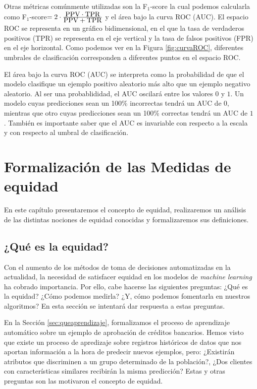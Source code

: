 \documentclass[oneside,openright,titlepage,numbers=noenddot,openany,headinclude,footinclude=true,
cleardoublepage=empty,abstractoff,BCOR=5mm,paper=a4,fontsize=12pt,main=spanish]{scrreprt}
\begin{document}
Otras métricas comúnmente utilizadas son la F$_1$-score la cual podemos calcularla como F$_1$-score$=2 \cdot \frac{\displaystyle \text{PPV}\cdot \text{TPR}}{\displaystyle \text{PPV}+\text{TPR}}$ y el área bajo la curva ROC (AUC). El espacio ROC se representa en
un gráfico bidimensional, en el que la tasa de verdaderos positivos (TPR) se representa en el eje vertical y la tasa de falsos positivos (FPR) en
el eje horizontal. Como podemos ver en la Figura \ref{fig:curvaROC}, diferentes umbrales de clasificación corresponden a diferentes puntos en el espacio ROC.  

El área bajo la curva ROC (AUC) se interpreta como la probabilidad de que el modelo clasifique un ejemplo positivo aleatorio más alto que un ejemplo negativo aleatorio. Al ser una probablididad, el AUC oscilará entre los valores $0$ y $1$. Un modelo cuyas predicciones sean un 100\% incorrectas tendrá un AUC de $0$, mientras que otro cuyas predicciones sean un 100\% correctas tendrá un AUC de $1$. También es importante saber que el AUC es invariable con respecto a la escala y con respecto al umbral de clasificación.



\chapter{Formalización de las Medidas de equidad}

\label{ch:formalmedeq}

En este capítulo presentaremos el concepto de equidad, realizaremos un análisis de las distintas nociones de equidad conocidas y formalizaremos sus definiciones.

\section{¿Qué es la equidad?}

Con el aumento de los métodos de toma de decisiones automatizadas en la actualidad, la necesidad de satisfacer equidad en los modelos de \textit{machine learning} ha cobrado importancia. Por ello, cabe hacerse las siguientes preguntas: ¿Qué es la equidad? ¿Cómo podemos medirla? ¿Y, cómo podemos fomentarla en nuestros algoritmos? En esta sección se intentará dar respuesta a estas preguntas.

En la Sección \ref{sec:queaprendizaje}, formalizamos el proceso de aprendizaje automático sobre un ejemplo de aprobación de créditos bancarios. Hemos visto que existe un proceso de apredizaje sobre registros históricos de datos que nos aportan información a la hora de predecir nuevos ejemplos, pero: ¿Existirán atributos que discriminen a un grupo determinado de la población?, ¿Dos clientes con características similares recibirán la misma predicción? Estas y otras preguntas son las motivaron el concepto de equidad.\\
\end{document}
